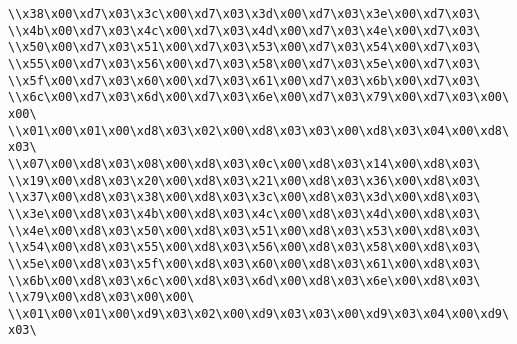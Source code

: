 \verb|\\x38\x00\xd7\x03\x3c\x00\xd7\x03\x3d\x00\xd7\x03\x3e\x00\xd7\x03\|\newline
\verb|\\x4b\x00\xd7\x03\x4c\x00\xd7\x03\x4d\x00\xd7\x03\x4e\x00\xd7\x03\|\newline
\verb|\\x50\x00\xd7\x03\x51\x00\xd7\x03\x53\x00\xd7\x03\x54\x00\xd7\x03\|\newline
\verb|\\x55\x00\xd7\x03\x56\x00\xd7\x03\x58\x00\xd7\x03\x5e\x00\xd7\x03\|\newline
\verb|\\x5f\x00\xd7\x03\x60\x00\xd7\x03\x61\x00\xd7\x03\x6b\x00\xd7\x03\|\newline
\verb|\\x6c\x00\xd7\x03\x6d\x00\xd7\x03\x6e\x00\xd7\x03\x79\x00\xd7\x03\x00\x00\|\newline
\verb|\\x01\x00\x01\x00\xd8\x03\x02\x00\xd8\x03\x03\x00\xd8\x03\x04\x00\xd8\x03\|\newline
\verb|\\x07\x00\xd8\x03\x08\x00\xd8\x03\x0c\x00\xd8\x03\x14\x00\xd8\x03\|\newline
\verb|\\x19\x00\xd8\x03\x20\x00\xd8\x03\x21\x00\xd8\x03\x36\x00\xd8\x03\|\newline
\verb|\\x37\x00\xd8\x03\x38\x00\xd8\x03\x3c\x00\xd8\x03\x3d\x00\xd8\x03\|\newline
\verb|\\x3e\x00\xd8\x03\x4b\x00\xd8\x03\x4c\x00\xd8\x03\x4d\x00\xd8\x03\|\newline
\verb|\\x4e\x00\xd8\x03\x50\x00\xd8\x03\x51\x00\xd8\x03\x53\x00\xd8\x03\|\newline
\verb|\\x54\x00\xd8\x03\x55\x00\xd8\x03\x56\x00\xd8\x03\x58\x00\xd8\x03\|\newline
\verb|\\x5e\x00\xd8\x03\x5f\x00\xd8\x03\x60\x00\xd8\x03\x61\x00\xd8\x03\|\newline
\verb|\\x6b\x00\xd8\x03\x6c\x00\xd8\x03\x6d\x00\xd8\x03\x6e\x00\xd8\x03\|\newline
\verb|\\x79\x00\xd8\x03\x00\x00\|\newline
\verb|\\x01\x00\x01\x00\xd9\x03\x02\x00\xd9\x03\x03\x00\xd9\x03\x04\x00\xd9\x03\|\newline
